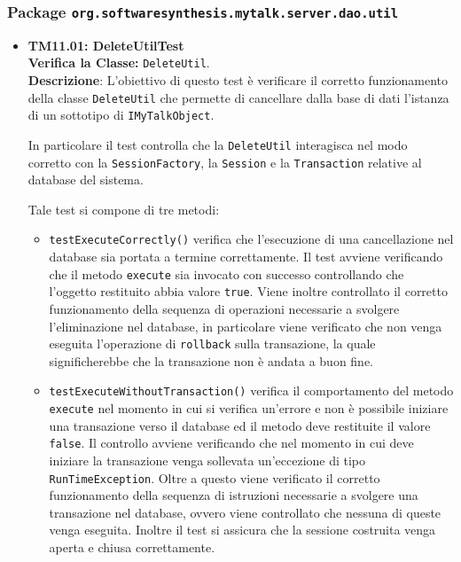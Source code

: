\subsubsection{Package \texttt{org.softwaresynthesis.mytalk.server.dao.util}}
\begin{itemize}

\item[\passed] \textbf{TM11.01: DeleteUtilTest}\\
\textbf{Verifica la Classe:} \texttt{DeleteUtil}.\\
\textbf{Descrizione}: L'obiettivo di questo test è verificare il corretto funzionamento della classe \texttt{DeleteUtil} che permette di cancellare dalla base di dati l'istanza di un sottotipo di \texttt{IMyTalkObject}.

In particolare il test controlla che la \texttt{DeleteUtil} interagisca nel modo corretto con la \texttt{SessionFactory}, la \texttt{Session} e la \texttt{Transaction} relative al database del sistema.

Tale test si compone di tre metodi:
\begin{itemize}
\item \texttt{testExecuteCorrectly()} verifica che l'esecuzione di una cancellazione nel database sia portata a termine correttamente. Il test avviene verificando che il metodo \texttt{execute} sia invocato con successo controllando che l'oggetto restituito abbia valore \texttt{true}. Viene inoltre controllato il corretto funzionamento della sequenza di operazioni necessarie a svolgere l'eliminazione nel database, in particolare viene verificato che non venga eseguita l'operazione di \texttt{rollback} sulla transazione, la quale significherebbe che la transazione non è andata a buon fine.

\item \texttt{testExecuteWithoutTransaction()} verifica il comportamento del metodo\\ \texttt{execute} nel momento in cui si verifica un'errore e non è possibile iniziare una transazione verso il database ed il metodo deve restituite il valore \texttt{false}. Il controllo avviene verificando che nel momento in cui deve iniziare la transazione venga sollevata un'eccezione di tipo \texttt{RunTimeException}. Oltre a questo viene verificato il corretto funzionamento della sequenza di istruzioni necessarie a svolgere una transazione nel database, ovvero viene controllato che nessuna di queste venga eseguita. Inoltre il test si assicura che la sessione costruita venga aperta e chiusa correttamente.


\end{itemize}
\end{itemize}
